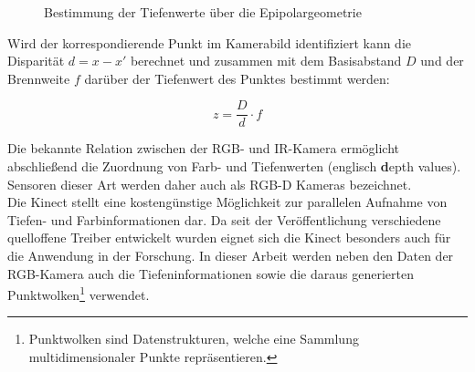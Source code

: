 \begin{figure}[ht]
	\begin{center}
		\caption{Bestimmung der Tiefenwerte über die Epipolargeometrie}
		\label{fig.kinect_depth}
	\end{center}
\end{figure}

Wird der korrespondierende Punkt im Kamerabild identifiziert kann die Disparität $d = x - x'$ berechnet und zusammen mit dem Basisabstand $D$ und der Brennweite $f$ darüber der Tiefenwert des Punktes bestimmt werden:

\begin{equation}
z = \frac{D}{d}\cdot f
\end{equation}

Die bekannte Relation zwischen der RGB- und IR-Kamera ermöglicht abschließend die Zuordnung von Farb- und Tiefenwerten (englisch \textbf{d}epth values). Sensoren dieser Art werden daher auch als RGB-D Kameras bezeichnet.\\

Die Kinect stellt eine kostengünstige Möglichkeit zur parallelen Aufnahme von Tiefen- und Farbinformationen dar. Da seit der Veröffentlichung verschiedene quelloffene Treiber entwickelt wurden eignet sich die Kinect besonders auch für die Anwendung in der Forschung. In dieser Arbeit werden neben den Daten der RGB-Kamera auch die Tiefeninformationen sowie die daraus generierten Punktwolken\footnote{Punktwolken sind Datenstrukturen, welche eine Sammlung multidimensionaler Punkte repräsentieren.
} verwendet.



